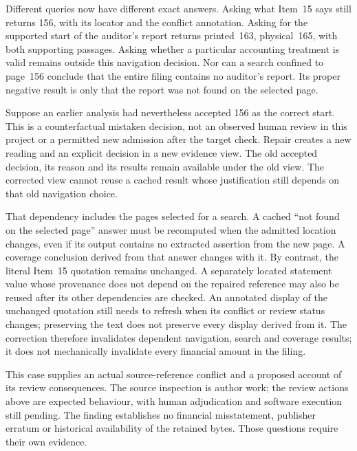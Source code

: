 Different queries now have different exact answers. Asking what Item~15 says
still returns 156, with its locator and the conflict annotation. Asking for
the supported start of the auditor's report returns printed~163, physical~165,
with both supporting passages. Asking whether a particular accounting treatment
is valid remains outside this navigation decision. Nor can a search confined
to page~156 conclude that the entire filing contains no auditor's report.
Its proper negative result is only that the report was not found on the
selected page.

Suppose an earlier analysis had nevertheless accepted 156 as the correct
start. This is a counterfactual mistaken decision, not an observed human review
in this project or a permitted new admission after the target check. Repair
creates a new reading and an explicit  decision in a new
evidence view. The old accepted decision, its reason and its results remain
available under the old view. The corrected view cannot reuse a cached result
whose justification still depends on that old navigation choice.

That dependency includes the pages selected for a search. A cached
``not found on the selected page'' answer must be recomputed when the admitted
location changes, even if its output contains no extracted assertion from
the new page. A coverage conclusion derived from that answer changes with it.
By contrast, the literal Item~15 quotation remains unchanged. A separately
located statement value whose provenance does not depend on the repaired
reference may also be reused after its other dependencies are checked.
An annotated display of the unchanged quotation still needs to refresh when
its conflict or review status changes; preserving the text does not preserve
every display derived from it.
The correction therefore invalidates dependent navigation, search and coverage
results; it does not mechanically invalidate every financial amount in the
filing.

This case supplies an actual source-reference conflict and a proposed account
of its review consequences. The source inspection is author work; the review
actions above are expected behaviour, with human adjudication and software
execution still pending. The finding establishes no financial misstatement,
publisher erratum or historical availability of the retained bytes. Those
questions require their own evidence.

